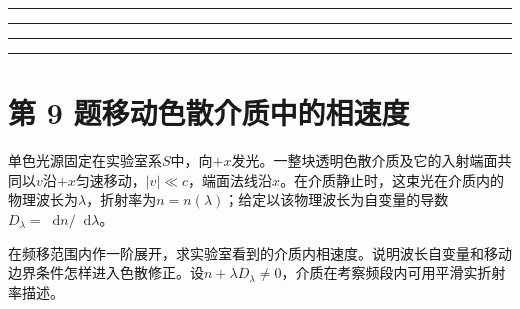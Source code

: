 \documentclass[UTF8,fontset=fandol,a4paper,11pt]{ctexart}
\newcommand{\dd}{\mathop{}\!\mathrm{d}}
\newcommand{\workarea}{\par\vspace{7mm}\noindent{\small\color{muted}作答区}\par\vspace{4mm}
\noindent\textcolor{rulegray}{\rule{\linewidth}{0.3pt}}\par\vspace{16mm}
\noindent\textcolor{rulegray}{\rule{\linewidth}{0.3pt}}\par\vspace{16mm}
\noindent\textcolor{rulegray}{\rule{\linewidth}{0.3pt}}\par\vspace{16mm}
\noindent\textcolor{rulegray}{\rule{\linewidth}{0.3pt}}}
\begin{document}
\workarea

\clearpage


\section*{第 9 题\quad 移动色散介质中的相速度}\label{q:9}

单色光源固定在实验室系$S$中，向$+x$发光。一整块透明色散介质及它的入射端面共同以$v$沿$+x$匀速移动，$|v|\ll c$，端面法线沿$x$。在介质静止时，这束光在介质内的物理波长为$\lambda$，折射率为$n=n(\lambda)$；给定以该物理波长为自变量的导数$D_\lambda=\dd n/\dd\lambda$。

在频移范围内作一阶展开，求实验室看到的介质内相速度。说明波长自变量和移动边界条件怎样进入色散修正。设$n+\lambda D_\lambda\ne0$，介质在考察频段内可用平滑实折射率描述。
\end{document}
